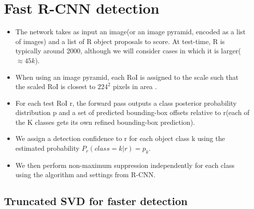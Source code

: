 \documentclass[11pt]{book}
\begin{document}
\chapter{Fast R-CNN detection}
\label{sec-1-2}


\begin{itemize}
\item The network takes as input an image(or an image pyramid, encoded as a list of images) and a list
     of R object proposals to score. At test-time, R is typically around 2000, although we will 
     consider cases in which it is larger($\approx45k$).
\item When using an image pyramid, each RoI is assigned to the scale such that the scaled RoI is
     closest to $224^2$ pixels in area \footnotemark[4].
\item For each test RoI r, the forward pass outputs a class posterior probability distribution p and
     a set of predicted bounding-box offsets relative to r(each of the K classes gets its own refined
     bounding-box prediction).
\item We assign a detection confidence to r for each object class k using the estimated probability 
     $P_r(class=k|r)=p_k$.
\item We then perform non-maximum suppression independently for each class using the algorithm and 
     settings from R-CNN\footnotemark[1].
\end{itemize}
\section{Truncated SVD for faster detection}
\label{sec-1-2-1}
\end{document}
